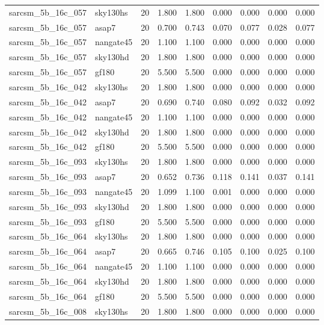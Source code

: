 \begin{tabular}{llrrrrrrr}
sarcsm\_5b\_16c\_057 & sky130hs & 20 & 1.800 & 1.800 & 0.000 & 0.000 & 0.000 & 0.000 \\
sarcsm\_5b\_16c\_057 & asap7 & 20 & 0.700 & 0.743 & 0.070 & 0.077 & 0.028 & 0.077 \\
sarcsm\_5b\_16c\_057 & nangate45 & 20 & 1.100 & 1.100 & 0.000 & 0.000 & 0.000 & 0.000 \\
sarcsm\_5b\_16c\_057 & sky130hd & 20 & 1.800 & 1.800 & 0.000 & 0.000 & 0.000 & 0.000 \\
sarcsm\_5b\_16c\_057 & gf180 & 20 & 5.500 & 5.500 & 0.000 & 0.000 & 0.000 & 0.000 \\
sarcsm\_5b\_16c\_042 & sky130hs & 20 & 1.800 & 1.800 & 0.000 & 0.000 & 0.000 & 0.000 \\
sarcsm\_5b\_16c\_042 & asap7 & 20 & 0.690 & 0.740 & 0.080 & 0.092 & 0.032 & 0.092 \\
sarcsm\_5b\_16c\_042 & nangate45 & 20 & 1.100 & 1.100 & 0.000 & 0.000 & 0.000 & 0.000 \\
sarcsm\_5b\_16c\_042 & sky130hd & 20 & 1.800 & 1.800 & 0.000 & 0.000 & 0.000 & 0.000 \\
sarcsm\_5b\_16c\_042 & gf180 & 20 & 5.500 & 5.500 & 0.000 & 0.000 & 0.000 & 0.000 \\
sarcsm\_5b\_16c\_093 & sky130hs & 20 & 1.800 & 1.800 & 0.000 & 0.000 & 0.000 & 0.000 \\
sarcsm\_5b\_16c\_093 & asap7 & 20 & 0.652 & 0.736 & 0.118 & 0.141 & 0.037 & 0.141 \\
sarcsm\_5b\_16c\_093 & nangate45 & 20 & 1.099 & 1.100 & 0.001 & 0.000 & 0.000 & 0.000 \\
sarcsm\_5b\_16c\_093 & sky130hd & 20 & 1.800 & 1.800 & 0.000 & 0.000 & 0.000 & 0.000 \\
sarcsm\_5b\_16c\_093 & gf180 & 20 & 5.500 & 5.500 & 0.000 & 0.000 & 0.000 & 0.000 \\
sarcsm\_5b\_16c\_064 & sky130hs & 20 & 1.800 & 1.800 & 0.000 & 0.000 & 0.000 & 0.000 \\
sarcsm\_5b\_16c\_064 & asap7 & 20 & 0.665 & 0.746 & 0.105 & 0.100 & 0.025 & 0.100 \\
sarcsm\_5b\_16c\_064 & nangate45 & 20 & 1.100 & 1.100 & 0.000 & 0.000 & 0.000 & 0.000 \\
sarcsm\_5b\_16c\_064 & sky130hd & 20 & 1.800 & 1.800 & 0.000 & 0.000 & 0.000 & 0.000 \\
sarcsm\_5b\_16c\_064 & gf180 & 20 & 5.500 & 5.500 & 0.000 & 0.000 & 0.000 & 0.000 \\
sarcsm\_5b\_16c\_008 & sky130hs & 20 & 1.800 & 1.800 & 0.000 & 0.000 & 0.000 & 0.000 \\

\end{tabular}
